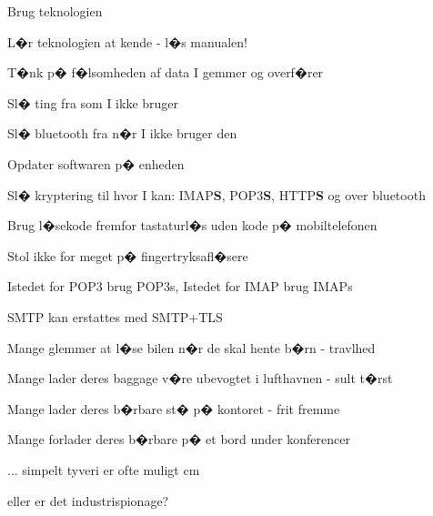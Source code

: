 \documentclass[20pt,landscape,a4paper,footrule]{foils}
\begin{document}

\begin{list1}

\item Brug teknologien
\item L�r teknologien at kende - l�s manualen!
\item T�nk p� f�lsomheden af data I gemmer og overf�rer
\begin{list2}
\item Sl� ting fra som I ikke bruger
\item Sl� bluetooth fra n�r I ikke bruger den
\item Opdater softwaren p� enheden
\item Sl� kryptering til hvor I kan: IMAP{\bf S}, POP3{\bf S},
  HTTP{\bf S} og over bluetooth
\item Brug l�sekode fremfor tastaturl�s uden kode p� mobiltelefonen
\item Stol ikke for meget p� fingertryksafl�sere

\end{list2}

\end{list1}


\centerline{Istedet for POP3 brug POP3s, Istedet for IMAP brug IMAPs}




\centerline{SMTP kan erstattes med SMTP+TLS}





\begin{list1}
\item Mange glemmer at l�se bilen n�r de skal hente b�rn - travlhed
\item Mange lader deres baggage v�re ubevogtet i lufthavnen - sult
  t�rst
\item Mange lader deres b�rbare st� p� kontoret - frit fremme
\item Mange forlader deres b�rbare p� et bord under konferencer
\item ... simpelt tyveri er ofte muligt
 cm
\item eller er det industrispionage?
\end{list1}
\end{document}
